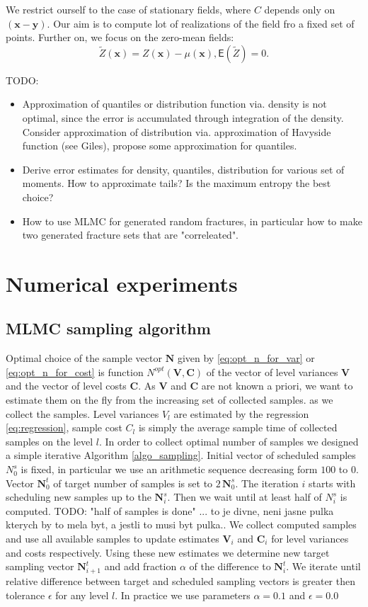 \documentclass{article}
\def\vc#1{\mathbf{\boldsymbol{#1}}}     %
\def \E{{\mathsf E}}
\def\todo#1{{\color{red}TODO: #1}}
\begin{document}
We restrict ourself to the case of stationary fields, where $C$ depends only on $(\vc x - \vc y)$. Our aim is to compute lot of realizations of the field fro a fixed set of points. Further on, we focus on the zero-mean fields:
\[
    \tilde Z(\vc x) = Z(\vc x) - \mu(\vc x), \E(\tilde Z) = 0.
\]

TODO:
\begin{itemize}
\item Approximation of quantiles or distribution function via. density is not optimal, since the error is accumulated through integration of the density. Consider approximation of distribution via. approximation of Havyside function (see Giles), propose some approximation for quantiles.

\item Derive error estimates for density, quantiles, distribution  for various set of moments. How to approximate tails? Is the maximum entropy the best choice?

\item How to use MLMC for generated random fractures, in particular how to make two generated fracture sets that are "correleated".
\end{itemize}

\section{Numerical experiments}

\subsection{MLMC sampling algorithm}
Optimal choice of the sample vector $\vc N$ given by \eqref{eq:opt_n_for_var} or \eqref{eq:opt_n_for_cost} is function $N^{opt}(\vc V, \vc C)$ of the vector of level variances $\vc V$ and the vector of level costs $\vc C$. As $\vc V$ and $\vc C$ are not known a priori, we want to estimate them on the fly from the increasing set of collected samples. as we collect the samples.  Level variances $V_l$ are estimated by the regression \eqref{eq:regression}, sample cost $C_l$ is simply the average sample time of collected samples on the level $l$. 
In order to collect optimal number of samples we designed a simple iterative Algorithm \ref{algo_sampling}. 
Initial vector of scheduled samples $N^s_0$ is fixed, in particular we use an arithmetic sequence decreasing form $100$ to $0$. Vector $\vc N^t_0$ of target number of samples is set to $2\,\vc N^s_0$. The iteration $i$ starts with scheduling new samples up to the $\vc N^s_i$.
Then we wait until at least half of $N^s_i$ is computed. \todo{"half of samples is done" ... to je divne, neni jasne pulka kterych by to mela byt, a jestli to musi byt pulka.}. We collect computed samples and use all available samples to update estimates $\vc V_i$ and $\vc C_i$ for level variances and costs respectively.
Using these new estimates we determine new target sampling vector $\vc N^t_{i+1}$ and
add fraction $\alpha$ of the difference to $\vc N^t_{i}$. We iterate until relative difference between target and scheduled sampling vectors is greater then tolerance $\epsilon$ for any level $l$.
In practice we use parameters $\alpha=0.1$ and $\epsilon = 0.0$
\end{document}
